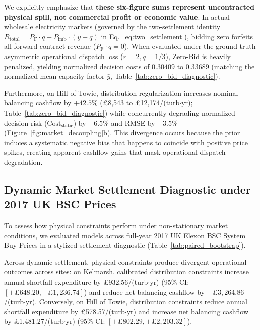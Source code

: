 We explicitly emphasize that \textbf{these six-figure sums represent uncontracted physical spill, not commercial profit or economic value}. In actual wholesale electricity markets (governed by the two-settlement identity $R_{\text{total}} = P_{\text{F}} \cdot q + P_{\text{imb}} \cdot (y - q)$ in Eq.~\eqref{eq:two_settlement}), bidding zero forfeits all forward contract revenue ($P_{\text{F}} \cdot q = 0$). When evaluated under the ground-truth asymmetric operational dispatch loss ($r=2, q=1/3$), Zero-Bid is heavily penalized, yielding normalized decision costs of $0.30409$ to $0.33689$ (matching the normalized mean capacity factor $\bar{y}$, Table~\ref{tab:zero_bid_diagnostic}).

Furthermore, on Hill of Towie, distribution regularization increases nominal balancing cashflow by $+42.5\%$ (\pounds 8,543 to \pounds 12,174/(turb$\cdot$yr); Table~\ref{tab:zero_bid_diagnostic}) while concurrently degrading normalized decision risk ($\text{Cost}_{\text{static}}$) by $+6.5\%$ and RMSE by $+3.5\%$ (Figure~\ref{fig:market_decoupling}b). This divergence occurs because the prior induces a systematic negative bias that happens to coincide with positive price spikes, creating apparent cashflow gains that mask operational dispatch degradation.

\subsection{Dynamic Market Settlement Diagnostic under 2017 UK BSC Prices}
To assess how physical constraints perform under non-stationary market conditions, we evaluated models across full-year 2017 UK Elexon BSC System Buy Prices in a stylized settlement diagnostic (Table~\ref{tab:paired_bootstrap}).



Across dynamic settlement, physical constraints produce divergent operational outcomes across sites: on Kelmarsh, calibrated distribution constraints increase annual shortfall expenditure by \pounds 932.56/(turb$\cdot$yr) (95\% CI: $[+\pounds 648.20, +\pounds 1{,}236.74]$) and reduce net balancing cashflow by $-\pounds 3{,}264.86$/(turb$\cdot$yr). Conversely, on Hill of Towie, distribution constraints reduce annual shortfall expenditure by \pounds 578.57/(turb$\cdot$yr) and increase net balancing cashflow by \pounds 1{,}481.27/(turb$\cdot$yr) (95\% CI: $[+\pounds 802.29, +\pounds 2{,}203.32]$).

